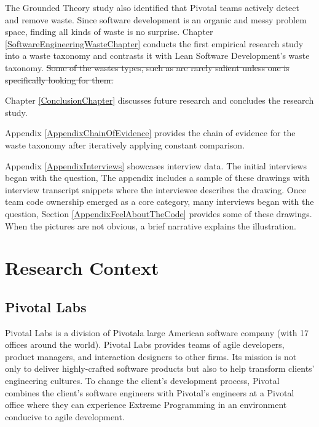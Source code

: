 The Grounded Theory study also identified that Pivotal teams actively detect and remove waste. Since software development is an organic and messy problem space, finding all kinds of waste is no surprise.  Chapter \ref{SoftwareEngineeringWasteChapter} conducts the first empirical research study into a waste taxonomy and contrasts it with Lean Software Development's waste taxonomy. \sout{Some of the wastes types, such as  are rarely salient unless one is specifically looking for them.}


Chapter \ref{ConclusionChapter} discusses future research and concludes the research study. 


Appendix \ref{AppendixChainOfEvidence} provides the chain of evidence for the waste taxonomy after iteratively applying constant comparison. 


Appendix \ref{AppendixInterviews} showcases interview data. The initial interviews began with the question,  The appendix includes a sample of these drawings with interview transcript snippets where the interviewee describes the drawing. Once team code ownership emerged as a core category, many interviews began with the question,  Section \ref{AppendixFeelAboutTheCode} provides some of these drawings. When the pictures are not obvious, a brief narrative explains the illustration.




\chapter{Research Context}
\label{ResearchContextChapter}


\section{Pivotal Labs}
Pivotal Labs is a division of Pivotal\textemdash a large American software company (with 17 offices around the world). Pivotal Labs provides teams of agile developers, product managers, and interaction designers to other firms. Its mission is not only to deliver highly-crafted software products but also to help transform clients' engineering cultures. To change the client's development process, Pivotal combines the client's software engineers with Pivotal's engineers at a Pivotal office where they can experience Extreme Programming \cite{BeckExtremeProgramming2004} in an environment conducive to agile development. 


